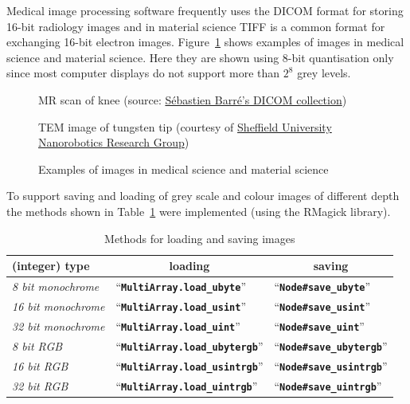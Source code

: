 \documentclass[12pt,a4paper,oneside,openright]{book}
\newcommand{\fig}[1]{Figure~\ref{fig:#1}}
\newcommand{\tbl}[1]{Table~\ref{tbl:#1}}
\newcommand{\code}[1]{``\texttt{\textbf{\textcolor{codegray}{\small{#1}}}}''}
\begin{document}
\begin{CJK}{UTF8}{}
Medical image processing software frequently uses the \ac{DICOM} format for storing 16-bit radiology images and in material science \ac{TIFF} is a common format for exchanging 16-bit electron images. \fig{mono16} shows examples of images in medical science and material science. Here they are shown using 8-bit quantisation only since most computer displays do not support more than $2^8$ grey levels.
\begin{figure}[htbp]
   \begin{center}
     \begin{minipage}[t]{.495\textwidth}
         \acs{MR} scan of knee (source: \href{http://www.barre.nom.fr/medical/samples/}{Sébastien Barré's DICOM collection})
     \end{minipage}
     \begin{minipage}[t]{.495\textwidth}
       \acs{TEM} image of tungsten tip (courtesy of \href{http://nano.group.shef.ac.uk/}{Sheffield University Nanorobotics Research Group})
     \end{minipage}
     \caption{Examples of images in medical science and material science\label{fig:mono16}}
   \end{center}
\end{figure}
To support saving and loading of grey scale and colour images of different depth the methods shown in \tbl{magick} were implemented (using the RMagick library).
\begin{table}[htbp]
  \begin{center}
    \caption{Methods for loading and saving images\label{tbl:magick}}\vspace{1em}
    \begin{tabular}{lll}\toprule
      \textbf{(integer) type} & \multicolumn{1}{c}{\textbf{loading}} & \multicolumn{1}{c}{\textbf{saving}}\\\midrule
      \emph{8 bit monochrome}  & \code{MultiArray.load\_ubyte} & \code{Node\#save\_ubyte}\\
      \emph{16 bit monochrome} & \code{MultiArray.load\_usint} & \code{Node\#save\_usint}\\
      \emph{32 bit monochrome} & \code{MultiArray.load\_uint}  & \code{Node\#save\_uint}\\\midrule
      \emph{8 bit \acs{RGB}}   & \code{MultiArray.load\_ubytergb} & \code{Node\#save\_ubytergb}\\
      \emph{16 bit \acs{RGB}}  & \code{MultiArray.load\_usintrgb} & \code{Node\#save\_usintrgb}\\
      \emph{32 bit \acs{RGB}}  & \code{MultiArray.load\_uintrgb}  & \code{Node\#save\_uintrgb}\\\bottomrule
    \end{tabular}
  \end{center}
\end{table}


\end{CJK}
\end{document}
